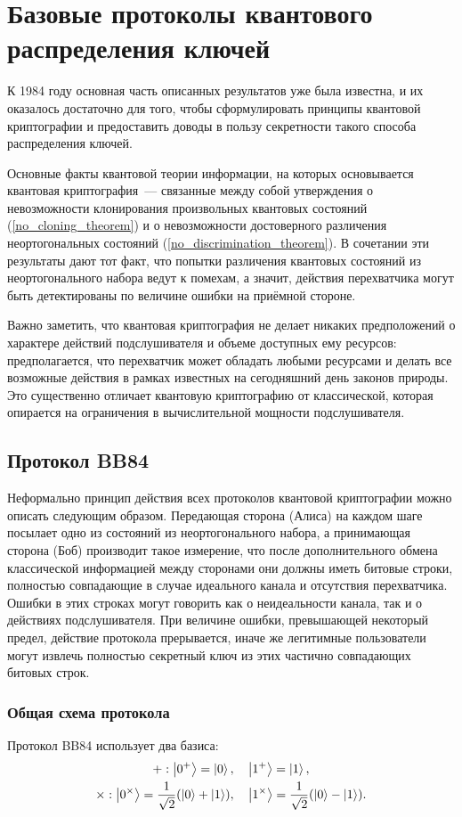 \section{Базовые протоколы квантового распределения ключей}
К 1984 году основная часть описанных результатов уже была известна, и их оказалось достаточно для того, чтобы сформулировать принципы квантовой криптографии и предоставить доводы в пользу секретности такого способа распределения ключей. 

Основные факты квантовой теории информации, на которых основывается квантовая криптография~--- связанные между собой утверждения о невозможности клонирования произвольных квантовых состояний (\ref{no_cloning_theorem}) и о невозможности достоверного различения неортогональных состояний (\ref{no_discrimination_theorem}). В сочетании эти результаты дают тот факт, что попытки различения квантовых состояний из неортогонального набора ведут к помехам, а значит, действия перехватчика могут быть детектированы по величине ошибки на приёмной стороне.

Важно заметить, что квантовая криптография не делает никаких предположений о характере действий подслушивателя и объеме доступных ему ресурсов: предполагается, что перехватчик может обладать любыми ресурсами и делать все возможные действия в рамках известных на сегодняшний день законов природы. Это существенно отличает квантовую криптографию от классической, которая опирается на ограничения в вычислительной мощности подслушивателя.

\subsection{Протокол BB84}
Неформально принцип действия всех протоколов квантовой криптографии можно описать следующим образом. Передающая сторона (Алиса) на каждом шаге посылает одно из состояний из неортогонального набора, а принимающая сторона (Боб) производит такое измерение, что после дополнительного обмена классической информацией между сторонами они должны иметь битовые строки, полностью совпадающие в случае идеального канала и отсутствия перехватчика. Ошибки в этих строках могут говорить как о неидеальности канала, так и о действиях подслушивателя. При величине ошибки, превышающей некоторый предел, действие протокола прерывается, иначе же легитимные пользователи могут извлечь полностью секретный ключ из этих частично совпадающих битовых строк.

\subsubsection{Общая схема протокола}
Протокол BB84 \cite{bb84} использует два базиса:
\begin{gather}
  +: \left| 0^+ \right\rangle = \left| 0 \right\rangle,\quad \left| 1^+ \right\rangle = \left| 1 \right\rangle, \nonumber\\
  \times: \left| 0^\times \right\rangle = \frac{1}{\sqrt{2}}(\left| 0 \right\rangle + \left| 1 \right\rangle),\quad \left| 1^\times \right\rangle = \frac{1}{\sqrt{2}}(\left| 0 \right\rangle - \left| 1 \right\rangle).
\end{gather}

